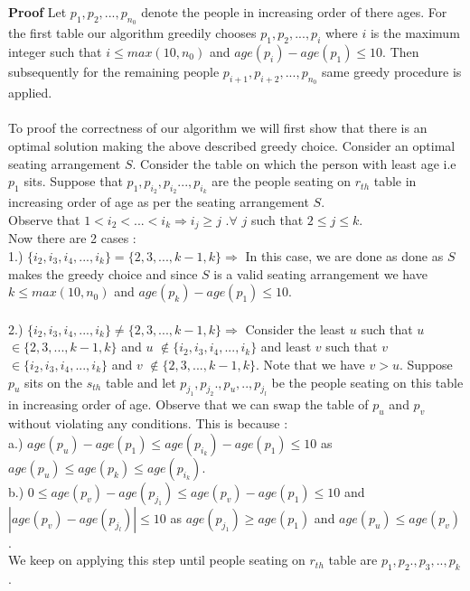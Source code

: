\documentclass[a4paper]{article}
\begin{document}
\textbf{Proof} Let $p_{1},p_{2},...,p_{n_{0}}$ denote the people in increasing order of there ages. For the first table our algorithm greedily chooses $p_{1},p_{2},...,p_{i}$ where $i$ is the maximum integer such that $ i \leq max(10,n_{0})$ and $age(p_{i})-age(p_{1}) \leq 10$. Then subsequently for the remaining people $p_{i+1},p_{i+2},...,p_{n_{0}}$ same greedy procedure is applied.
\\ \\
To proof the correctness of our algorithm we will first show that there is an optimal solution making the above described greedy choice.
Consider an optimal seating arrangement $S$.
Consider the table on which the person with least age i.e $p_{1}$ sits. Suppose that $p_{1},p_{i_{2}},p_{i_{2}}...,p_{i_{k}}$ are the people seating on $r_{th}$ table in increasing order of age as per the seating arrangement $S$.\\ Observe that $1 < i_{2} < ... <i_{k} \Rightarrow i_{j} \geq j$ $. \forall$ $j$ such that $ 2 \leq j \leq k$.\\
Now there are 2 cases :\\
1.) 
$\{i_{2},i_{3},i_{4},...,i_{k}\} = \{2,3,...,k-1,k\} \Rightarrow$ In this case, we are done as done as $S$ makes the greedy choice and since $S$ is a valid seating arrangement we have $ k \leq max(10,n_{0})$ and $age(p_{k})-age(p_{1}) \leq 10$.  \\ \\
2.)
$\{i_{2},i_{3},i_{4},...,i_{k}\} \neq \{2,3,...,k-1,k\} \Rightarrow$ Consider the least  $u$ such that $u$ $\in \{2,3,...,k-1,k\}$ and $u$ $\notin \{i_{2},i_{3},i_{4},...,i_{k}\}$ and least $v$ such that $v$ $\in \{i_{2},i_{3},i_{4},...,i_{k}\}$ and $v$ $\notin\{2,3,...,k-1,k\}$. Note that we have $v > u$. Suppose $p_{u}$ sits on the $s_{th}$ table and let $p_{j_{1}},p_{j_{2}}.,p_{u},..,p_{j_{l}}$ be the people seating on this table in increasing order of age. Observe that we can swap the table of $p_{u}$ and $p_{v}$ without violating any conditions. This is because : \\
a.) $ age(p_{u}) - age(p_{1}) \leq age(p_{i_{k}}) - age(p_{1}) \leq 10$ as  $age(p_{u})\leq age(p_{k}) \leq age(p_{i_{k}})$. \\
 b.) $ 0 \leq age(p_{v}) - age(p_{j_{1}}) \leq age(p_{v}) - age(p_{1}) \leq 10$  and $ |age(p_{v}) - age(p_{j_{l}})| \leq  10$ as  $age(p_{j_{1}})\geq age(p_{1})$ and $age(p_{u})\leq age(p_{v})$.
 \\ We keep on applying this step until people seating on $r_{th}$ table are $p_{1},p_{2}.,p_{3},..,p_{k}$.\\
\end{document}
